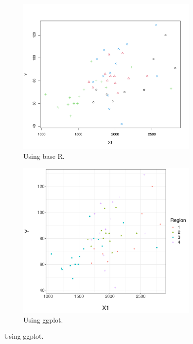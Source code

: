 \documentclass[12pt,letterpaper]{article}
\begin{document}
\begin{figure}[h!]
	\centering
			\caption{\footnotesize Differentiating between region by color and shape.}
		\label{fig:plot3d}
	\begin{subfigure}[t]{0.5\textwidth}
		\centering
				\caption{\footnotesize Using base R.}
		\includegraphics[width=0.99\textwidth]{plot_2c2.pdf}
	\end{subfigure}%
	\begin{subfigure}[t]{0.5\textwidth}
		\centering
			\caption{\footnotesize Using ggplot.}
		\includegraphics[width=0.99\textwidth]{plot_2c3.pdf}

	\end{subfigure}

\end{figure}
\end{document}
